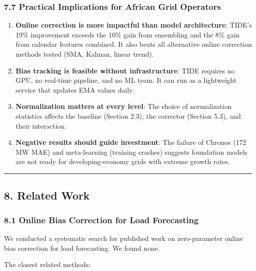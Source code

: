 \subsubsection{7.7 Practical Implications for African Grid
Operators}\label{practical-implications-for-african-grid-operators}

\begin{enumerate}
\def\labelenumi{\arabic{enumi}.}
\item
  \textbf{Online correction is more impactful than model architecture}:
  TIDE's 19\% improvement exceeds the 10\% gain from ensembling and the
  8\% gain from calendar features combined. It also beats all
  alternative online correction methods tested (SMA, Kalman, linear
  trend).
\item
  \textbf{Bias tracking is feasible without infrastructure}: TIDE
  requires no GPU, no real-time pipeline, and no ML team. It can run as
  a lightweight service that updates EMA values daily.
\item
  \textbf{Normalization matters at every level}: The choice of
  normalization statistics affects the baseline (Section 2.3), the
  corrector (Section 5.3), and their interaction.
\item
  \textbf{Negative results should guide investment}: The failure of
  Chronos (172 MW MAE) and meta-learning (training crashes) suggests
  foundation models are not ready for developing-economy grids with
  extreme growth rates.
\end{enumerate}

\begin{center}\rule{0.5\linewidth}{0.5pt}\end{center}

\subsection{8. Related Work}\label{related-work}

\subsubsection{8.1 Online Bias Correction for Load
Forecasting}\label{online-bias-correction-for-load-forecasting}

We conducted a systematic search for published work on zero-parameter
online bias correction for load forecasting. We found none.

The closest related methods:


